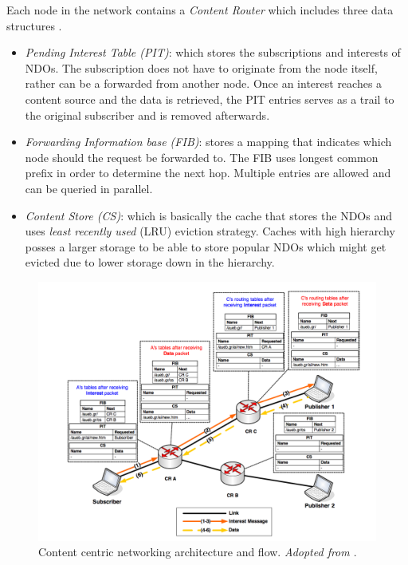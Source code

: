 Each node in the network contains a \textit{Content Router} which includes three data structures \cite{6563278}\cite{6231276}. 
\begin{itemize}
\item \textit{Pending Interest Table (PIT)}: which stores the subscriptions and interests of NDOs. The subscription does not have to originate  from the node itself, rather can be a forwarded from another node. Once an interest reaches a content source and the data is retrieved, the PIT entries serves as a trail to the original subscriber and is removed afterwards.

\item \textit{Forwarding Information base (FIB)}:  stores a mapping that indicates which node should the request be forwarded to. The FIB uses longest common prefix in order to determine the next hop. Multiple entries are allowed and can be queried in parallel.

\item \textit{Content Store (CS)}: which is basically the cache that stores the NDOs and uses \textit{least recently used} (LRU) eviction strategy. Caches with high hierarchy posses a larger storage to be able to store popular NDOs which might get evicted due to  lower storage down in the hierarchy.
\end{itemize}  

\begin{figure}[H]
	\centering
	\includegraphics[scale=0.4]{images/ccn2.png}
	\caption{Content centric networking architecture and flow. \textit{Adopted from \cite{6563278}}.}
	\label{fig:ccn}
\end{figure}

